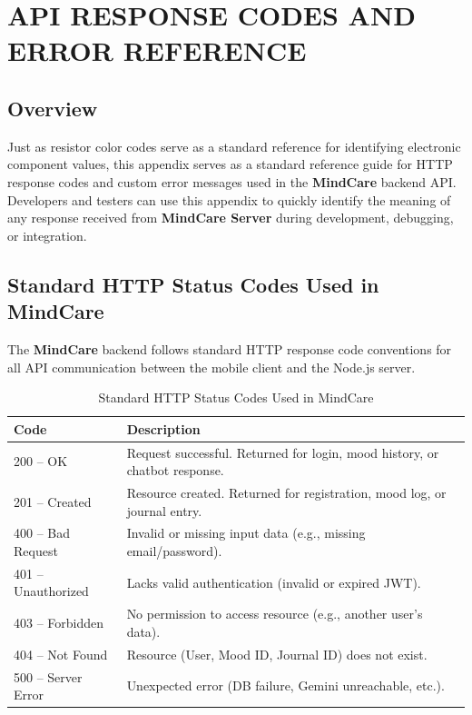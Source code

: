\documentclass[a4paper,12pt]{report}
\begin{document}
\chapter{API RESPONSE CODES AND ERROR REFERENCE}
\section{Overview}
Just as resistor color codes serve as a standard reference for identifying electronic component values, this appendix serves as a standard reference guide for HTTP response codes and custom error messages used in the \textbf{MindCare} backend API. Developers and testers can use this appendix to quickly identify the meaning of any response received from \textbf{MindCare Server} during development, debugging, or integration.

\section{Standard HTTP Status Codes Used in MindCare}
The \textbf{MindCare} backend follows standard HTTP response code conventions for all API communication between the mobile client and the Node.js server.

\begin{table}[ht!]
    \centering
    \begin{tabular}{|l|p{10cm}|}
        \hline
        \textbf{Code} & \textbf{Description} \\ \hline
        200 -- OK & Request successful. Returned for login, mood history, or chatbot response. \\ \hline
        201 -- Created & Resource created. Returned for registration, mood log, or journal entry. \\ \hline
        400 -- Bad Request & Invalid or missing input data (e.g., missing email/password). \\ \hline
        401 -- Unauthorized & Lacks valid authentication (invalid or expired JWT). \\ \hline
        403 -- Forbidden & No permission to access resource (e.g., another user's data). \\ \hline
        404 -- Not Found & Resource (User, Mood ID, Journal ID) does not exist. \\ \hline
        500 -- Server Error & Unexpected error (DB failure, Gemini unreachable, etc.). \\ \hline
    \end{tabular}
    \caption{Standard HTTP Status Codes Used in MindCare}
    \label{tab:http_codes}
\end{table}
\end{document}
